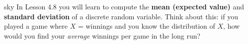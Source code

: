 \documentclass[10pt]{article}
\begin{document}
\vspace{0.1in}

\begin{blurbbox}{sky}
\small
In Lesson 4.8 you will learn to compute the \textbf{mean (expected value)} and
\textbf{standard deviation} of a discrete random variable. Think about this: if you
played a game where $X$ = winnings and you know the distribution of $X$, how would you
find your \emph{average} winnings per game in the long run?
\end{blurbbox}
\end{document}
